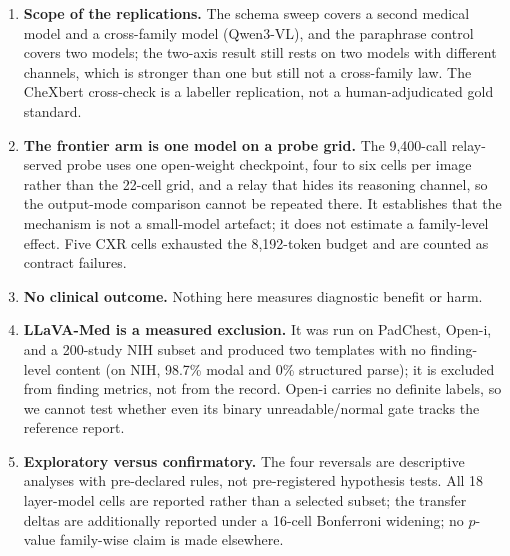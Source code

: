 \begin{enumerate}[leftmargin=1.2em,itemsep=2pt,topsep=2pt]
\item \textbf{Scope of the replications.} The schema sweep covers a second medical model and a cross-family model (Qwen3-VL), and the paraphrase control covers two models; the two-axis result still rests on two models with different channels, which is stronger than one but still not a cross-family law. The CheXbert cross-check is a labeller replication, not a human-adjudicated gold standard.
\item \textbf{The frontier arm is one model on a probe grid.} The 9,400-call relay-served probe uses one open-weight checkpoint, four to six cells per image rather than the 22-cell grid, and a relay that hides its reasoning channel, so the output-mode comparison cannot be repeated there. It establishes that the mechanism is not a small-model artefact; it does not estimate a family-level effect. Five CXR cells exhausted the 8,192-token budget and are counted as contract failures.
\item \textbf{No clinical outcome.} Nothing here measures diagnostic benefit or harm.
\item \textbf{LLaVA-Med is a measured exclusion.} It was run on PadChest, Open-i, and a 200-study NIH subset and produced two templates with no finding-level content (on NIH, 98.7\% modal and 0\% structured parse); it is excluded from finding metrics, not from the record. Open-i carries no definite labels, so we cannot test whether even its binary unreadable/normal gate tracks the reference report.
\item \textbf{Exploratory versus confirmatory.} The four reversals are descriptive analyses with pre-declared rules, not pre-registered hypothesis tests. All 18 layer-model cells are reported rather than a selected subset; the transfer deltas are additionally reported under a 16-cell Bonferroni widening; no $p$-value family-wise claim is made elsewhere.
\end{enumerate}
